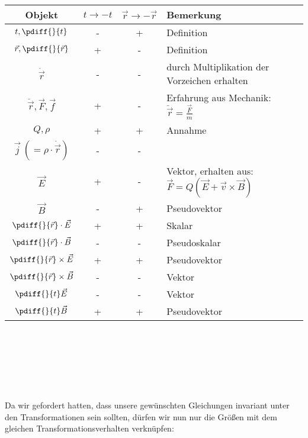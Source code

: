 \begin{tabular}{c|c|c|l}
Objekt & $t\rightarrow-t$ & $\vec{r}\rightarrow-\vec{r}$ & Bemerkung\\
\hline $t, \pdiff{}{t}$ & - & + & Definition\\
$\vec{r},\pdiff{}{\vec{r}}$ & + & -& Definition\\
$\dot{\vec{r}}$ & -& - & durch Multiplikation der Vorzeichen erhalten\\
$\ddot{\vec{r}},\vec{F},\vec{f}$ & + & - & Erfahrung aus Mechanik:\ $\ddot{\vec{r}}=\frac{\vec{F}}{m}$\\
$Q,\rho$ & + & + & Annahme\\
$\vec{j}\ (=\rho\cdot\dot{\vec{r}})$ & - & - & \\
$\vec{E}$ & + & - & Vektor, erhalten aus: $\vec{F}=Q(\vec{E}+\vec{v}\times\vec{B})$\\
$\vec{B}$ & - & + & Pseudovektor\\
$\pdiff{}{\vec{r}}\cdot\vec{E}$ & + & + & Skalar\\
$\pdiff{}{\vec{r}}\cdot\vec{B}$ & - & - & Pseudoskalar\\
$\pdiff{}{\vec{r}}\times\vec{E}$ & + & + & Pseudovektor\\
$\pdiff{}{\vec{r}}\times\vec{B}$ & - & - & Vektor\\
$\pdiff{}{t}\vec{E}$ & - & - & Vektor\\
$\pdiff{}{t}\vec{B}$ & + & + & Pseudovektor
\end{tabular}
\ \\
\ \\
\ \\
\ \\
\ \\
\ \\
Da wir gefordert hatten, dass unsere gewünschten Gleichungen invariant unter den Transformationen sein sollten, dürfen wir nun nur die Größen mit dem gleichen Transformationsverhalten verknüpfen:\ \\



